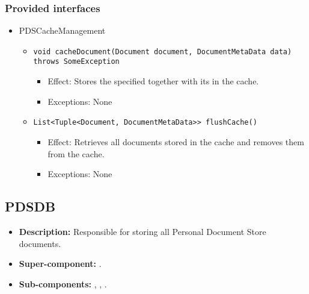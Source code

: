 \subsubsection*{Provided interfaces}
\begin{itemize}
    \item PDSCacheManagement
    \begin{itemize}
        \item \texttt{void cacheDocument(Document document, DocumentMetaData data) throws SomeException}
        \begin{itemize}
            \item Effect: Stores the specified  together with its  in the cache.
            \item Exceptions: None
        \end{itemize}

        \item \texttt{List<Tuple<Document, DocumentMetaData>> flushCache()}
		    \begin{itemize}
                \item Effect: Retrieves all documents stored in the cache and removes them from the cache.
                \item Exceptions: None
            \end{itemize}
    \end{itemize}
\end{itemize}

\subsection{PDSDB}
\begin{itemize}
    \item \textbf{Description:} Responsible for storing all Personal Document Store documents.
    \item \textbf{Super-component:} .
    \item \textbf{Sub-components:} , , .
\end{itemize}

